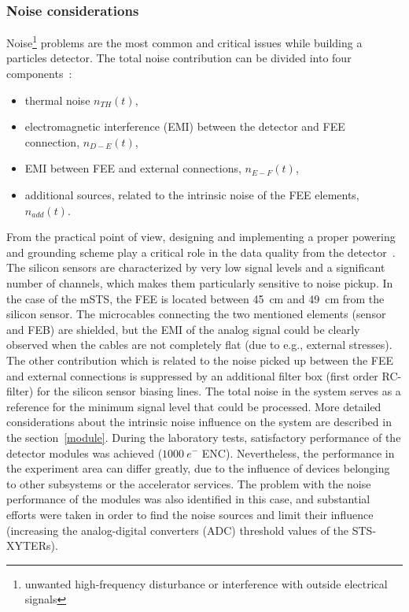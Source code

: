 \subsubsection{Noise considerations}
Noise\footnote{unwanted high-frequency disturbance or interference with outside electrical signals} problems are the most common and critical issues while building a particles detector. The total noise contribution can be divided into four components~\cite{noise_twepp2008}:
\begin{itemize}
    \item thermal noise $n_{TH}(t)$,
    \item electromagnetic interference (\gls{EMI}) between the detector and \gls{FEE} connection, $n_{D-E}(t)$,
    \item \gls{EMI} between \gls{FEE} and external connections, $n_{E-F}(t)$,
    \item additional sources, related to the intrinsic noise of the FEE elements, $n_{add}(t)$.
\end{itemize}

From the practical point of view, designing and implementing a proper powering and grounding scheme play a critical role in the data quality from the detector~\cite{Bobillier:1159563}. The silicon sensors are characterized by very low signal levels and a significant number of channels, which makes them particularly sensitive to noise pickup. In the case of the \gls{mSTS}, the \gls{FEE} is located between 45~cm and 49~cm from the silicon sensor. The microcables connecting the two mentioned elements (sensor and \gls{FEB}) are shielded, but the \gls{EMI} of the analog signal could be clearly observed when the cables are not completely flat (due to e.g., external stresses). The other contribution which is related to the noise picked up between the \gls{FEE} and external connections is suppressed by an additional filter box (first order RC-filter) for the silicon sensor biasing lines. The total noise in the system serves as a reference for the minimum signal level that could be processed. More detailed considerations about the intrinsic noise influence on the system are described in the section~\ref{module}. During the laboratory tests, satisfactory performance of the detector modules was achieved ($1000~e^{-}$ \gls{ENC}). Nevertheless, the performance in the experiment area can differ greatly, due to the influence of devices belonging to other subsystems or the accelerator services. The problem with the noise performance of the modules was also identified in this case, and substantial efforts were taken in order to find the noise sources and limit their influence (increasing the analog-digital converters (\gls{ADC}) threshold values of the STS-XYTERs). 

